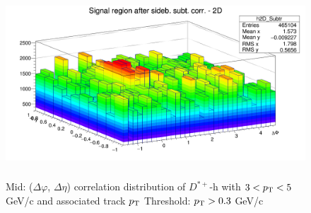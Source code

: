\begin{figure}
\centering
{\includegraphics[width=0.9\linewidth, height = 7cm]{figures/DStar_pp/h2D_Dstar_Subtr_Canvas_PtIntBins2to3_PoolInt_thr0dot3to99dot0}}
Mid: ($\Delta\varphi$, $\Delta\eta$) correlation distribution of $D^{*+}$-h with $3 < p_{\rm T} < 5$ GeV/c and associated track $p_{\rm T}$ Threshold: $p_{\rm T} > 0.3$ GeV/c
\label{fig:Dsubtr2D}

\end{figure}
\clearpage
%

 
